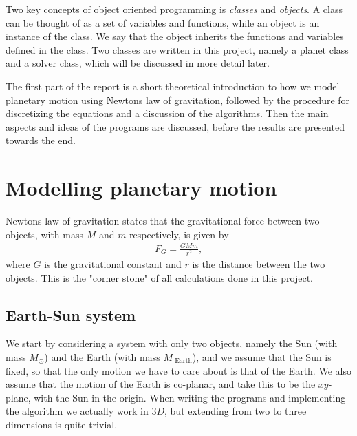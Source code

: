 \documentclass[12pt, a4paper]{article}
\begin{document}
Two key concepts of object oriented programming is \textit{classes} and \textit{objects}. A class can be 
thought of as a set of variables and functions, while an object is an instance of the class. We 
say that the object inherits the functions and variables defined in the class. Two classes are written in 
this project, namely a planet class and a solver class, which will be discussed in more detail later. 

The first part of the report is a short theoretical introduction to how we model planetary motion using 
Newtons law of gravitation, followed by the procedure for discretizing the equations and a discussion of 
the algorithms. Then the main aspects and ideas of the programs are discussed, before the results are 
presented towards the end.  

\section{Modelling planetary motion}

Newtons law of gravitation states that the gravitational force between two objects, with mass $M$ and $m$
respectively, is given by 
\begin{align}
F_G = \frac{GMm}{r^2}, 
\end{align}
where $G$ is the gravitational constant and $r$ is the distance between the two objects. This is 
the "corner stone" of all calculations done in this project. 

\subsection{Earth-Sun system}

We start by considering a system with only two objects, namely the Sun (with mass $M_{\odot}$) and the 
Earth (with mass $M_{\text{ Earth}}$), and we assume that the Sun is fixed, so that the only motion we 
have to care about is that of the Earth. We also assume that the motion of the Earth is co-planar, 
and take this 
to be the $xy$-plane, with the Sun in the origin. When writing the programs and implementing the 
algorithm we actually work in $3D$, but extending from two to three dimensions is quite trivial.  
\end{document}
